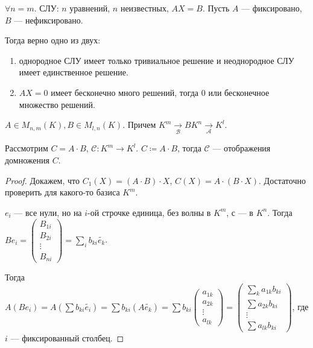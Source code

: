 \begin{theorem}
    $\forall n = m$. СЛУ: $n$ уравнений, $n$ неизвестных,  $AX=B$. Пусть  $A$ --- фиксировано,  $B$ --- нефиксировано.

    Тогда верно одно из двух: 
     \begin{enumerate}
         \item однородное СЛУ имеет только тривиальное решение и неоднородное СЛУ имеет единственное решение.
         \item $AX=0$ имеет бесконечно много решений, тогда 0 или бесконечное множество решений.
    \end{enumerate}
\end{theorem}
\begin{theorem}
    $A \in M_{n, m}(K), B \in M_{l, n}(K)$. Причем  $K^m \xrightarrow[\mathcal{B}]{} B K^n \xrightarrow[\mathcal{A}]{} K^l$.

    Рассмотрим  $C = A \cdot B$,  $\mathcal{C}\!: K^m \to K^l$.  $C \coloneqq A \cdot B$, тогда  $\mathcal{C}$ --- отображения домножения  $C$.
\end{theorem}
\begin{proof}
    Докажем, что $C_1(X) = (A \cdot B) \cdot X$,  $C(X) = A \cdot (B \cdot X)$. Достаточно проверить для какого-то базиса  $K^m$.

    $e_i$ --- все нули, но на  $i$-ой строчке единица,  без волны в $K^m$, с --- в  $K^n$.  Тогда  $Be_i = \begin{pmatrix} B_{1i} \\ B_{2i} \\ \vdots \\ B_{ni} \end{pmatrix} = \sum_i b_{ki} \widetilde{e_k}$. 

    Тогда $A(Be_i) = A(\sum b_{ki} \widetilde{e_i}) = \sum b_{ki}(A\widetilde{e_k}) = \sum b_{ki} \begin{pmatrix} a_{1k} \\ a_{2k} \\ \vdots \\ a_{lk} \end{pmatrix} = \begin{pmatrix} \sum_k a_{1k} b_{ki} \\ \sum a_{2k} b_{ki} \\ \vdots \\ \sum a_{lk} b_{ki} \end{pmatrix}$, где $i$ --- фиксированный столбец. 
\end{proof}

